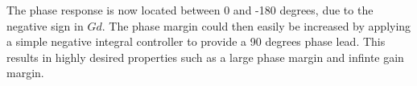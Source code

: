 The phase response is now located between 0 and -180 degrees, due to the negative sign in $Gd$. The phase margin could then easily be increased by applying a simple negative integral controller to provide a 90 degrees phase lead. This results in highly desired properties such as a large phase margin and infinte gain margin.   





